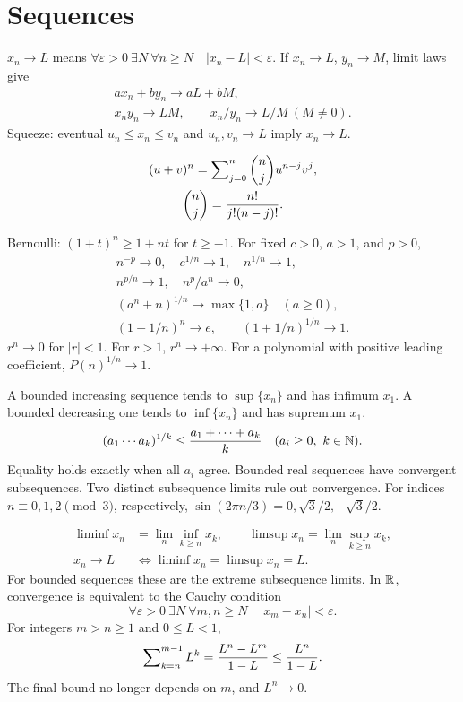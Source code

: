 \section{Sequences}
\label{sec:appendix:formula-sheet-sequences}
$x_n\to L$ means
$\forall\varepsilon>0\ \exists N\ \forall n\ge N\quad |x_n-L|<\varepsilon$.
If $x_n\to L$, $y_n\to M$, limit laws give
\[
  \begin{gathered}
    ax_n+by_n\to aL+bM,\\
    x_ny_n\to LM,\qquad x_n/y_n\to L/M\ (M\ne0).
  \end{gathered}
\]
Squeeze: eventual $u_n\le x_n\le v_n$ and $u_n,v_n\to L$ imply $x_n\to L$.

\ifdefined\standaloneformulasheet\else
{}
\[
  \begin{gathered}
    (u+v)^n=\sum\nolimits_{j=0}^n\binom nj u^{n-j}v^j,\\
    \binom nj=\frac{n!}{j!(n-j)!}.
  \end{gathered}
\]
\fi

Bernoulli: $(1+t)^n\ge1+nt$ for $t\ge-1$.
For fixed $c>0$, $a>1$, and $p>0$,
\[
  \begin{gathered}
    n^{-p}\to0,\quad c^{1/n}\to1,\quad n^{1/n}\to1,\\
    n^{p/n}\to1,\quad n^p/a^n\to0,\\
    (a^n+n)^{1/n}\to\max\{1,a\}\quad(a\ge0),\\
    (1+1/n)^n\to e,\qquad (1+1/n)^{1/n}\to1.
  \end{gathered}
\]
$r^n\to0$ for $|r|<1$. For $r>1$, $r^n\to+\infty$.
For a polynomial with positive leading coefficient, $P(n)^{1/n}\to1$.

A bounded increasing sequence tends to $\sup\{x_n\}$ and has infimum $x_1$.
A bounded decreasing one tends to $\inf\{x_n\}$ and has supremum $x_1$.
\[
  (a_1\cdots a_k)^{1/k}\le\frac{a_1+\cdots+a_k}{k}
  \quad(a_i\ge0,\ k\in\mathbb{N}).
\]
Equality holds exactly when all $a_i$ agree.
Bounded real sequences have convergent subsequences.
Two distinct subsequence limits rule out convergence.
For indices $n\equiv0,1,2\pmod3$, respectively,
$\sin(2\pi n/3)=0,\sqrt3/2,-\sqrt3/2$.

\[
  \begin{aligned}
    \liminf x_n&=\lim_n\inf_{k\ge n}x_k,\qquad
    \limsup x_n=\lim_n\sup_{k\ge n}x_k,\\
    x_n\to L&\iff\liminf x_n=\limsup x_n=L.
  \end{aligned}
\]
For bounded sequences these are the extreme subsequence limits.
In $\mathbb{R}$, convergence is equivalent to the Cauchy condition
\[
  \forall\varepsilon>0\ \exists N\ \forall m,n\ge N\quad
  |x_m-x_n|<\varepsilon.
\]
For integers $m>n\ge1$ and $0\le L<1$,
\[
  \sum\nolimits_{k=n}^{m-1}L^k
    =\frac{L^n-L^m}{1-L}\le\frac{L^n}{1-L}.
\]
The final bound no longer depends on $m$, and $L^n\to0$.

